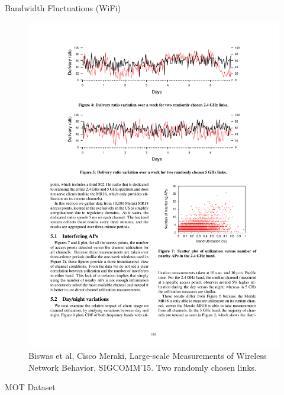 \begin{frame}{Bandwidth Fluctuations (WiFi)}
  \begin{figure}
    \includegraphics[width=\textwidth]{figures/bandwidth-wifi.pdf}
    \caption{Biswas et al, Cisco Meraki, Large-scale Measurements of Wireless
      Network Behavior, SIGCOMM'15. Two randomly chosen links.}
  \end{figure}
\end{frame}

\begin{frame}{MOT Dataset}
\end{frame}

